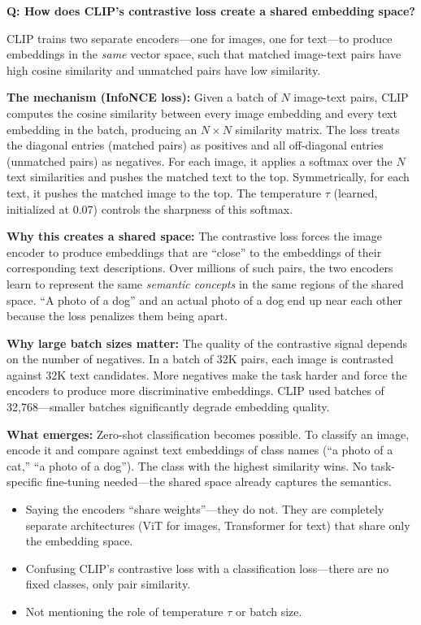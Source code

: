 \begin{interviewq}
\textbf{Q: How does CLIP's contrastive loss create a shared embedding space?}

 \quad {} \quad \badgefreq{\freqmed}

\stronganswer

CLIP trains two separate encoders---one for images, one for text---to produce embeddings in the \textit{same} vector space, such that matched image-text pairs have high cosine similarity and unmatched pairs have low similarity.

\textbf{The mechanism (InfoNCE loss):} Given a batch of $N$ image-text pairs, CLIP computes the cosine similarity between every image embedding and every text embedding in the batch, producing an $N \times N$ similarity matrix. The loss treats the diagonal entries (matched pairs) as positives and all off-diagonal entries (unmatched pairs) as negatives. For each image, it applies a softmax over the $N$ text similarities and pushes the matched text to the top. Symmetrically, for each text, it pushes the matched image to the top. The temperature $\tau$ (learned, initialized at 0.07) controls the sharpness of this softmax.

\textbf{Why this creates a shared space:} The contrastive loss forces the image encoder to produce embeddings that are ``close'' to the embeddings of their corresponding text descriptions. Over millions of such pairs, the two encoders learn to represent the same \textit{semantic concepts} in the same regions of the shared space. ``A photo of a dog'' and an actual photo of a dog end up near each other because the loss penalizes them being apart.

\textbf{Why large batch sizes matter:} The quality of the contrastive signal depends on the number of negatives. In a batch of 32K pairs, each image is contrasted against 32K text candidates. More negatives make the task harder and force the encoders to produce more discriminative embeddings. CLIP used batches of 32,768---smaller batches significantly degrade embedding quality.

\textbf{What emerges:} Zero-shot classification becomes possible. To classify an image, encode it and compare against text embeddings of class names (``a photo of a cat,'' ``a photo of a dog''). The class with the highest similarity wins. No task-specific fine-tuning needed---the shared space already captures the semantics.

\redflags
\begin{itemize}
    \item Saying the encoders ``share weights''---they do not. They are completely separate architectures (ViT for images, Transformer for text) that share only the embedding space.
    \item Confusing CLIP's contrastive loss with a classification loss---there are no fixed classes, only pair similarity.
    \item Not mentioning the role of temperature $\tau$ or batch size.
\end{itemize}


\end{interviewq}
